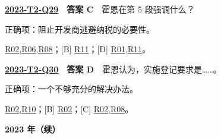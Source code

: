\documentclass[11pt,a4paper]{article}
\begin{document}
\label{idx-2023-T2-Q29}
\noindent\textbf{\href{https://zj139.github.io/math-notes/english/7985b9c2edc65f70cf714232/\#q29}{2023-T2-Q29}　答案 C}　霍恩在第 5 段强调什么？\par\nopagebreak
\noindent 正确项：阻止开发商逃避纳税的必要性。\par\nopagebreak
\noindent [A] \hyperref[cat-R02]{R02},\hyperref[cat-R06]{R06},\hyperref[cat-R08]{R08}；[B] \hyperref[cat-R11]{R11}；[D] \hyperref[cat-R01]{R01},\hyperref[cat-R11]{R11}。
\par\smallskip
{}\label{idx-2023-T2-Q30}
\noindent\textbf{\href{https://zj139.github.io/math-notes/english/7985b9c2edc65f70cf714232/\#q30}{2023-T2-Q30}　答案 D}　霍恩认为，实施登记要求是……。\par\nopagebreak
\noindent 正确项：一个不够充分的解决办法。\par\nopagebreak
\noindent [A] \hyperref[cat-R02]{R02},\hyperref[cat-R10]{R10}；[B] \hyperref[cat-R02]{R02}；[C] \hyperref[cat-R02]{R02},\hyperref[cat-R08]{R08}。
\par\smallskip
\clearpage\noindent\textbf{2023 年（续）}\par
\end{document}
